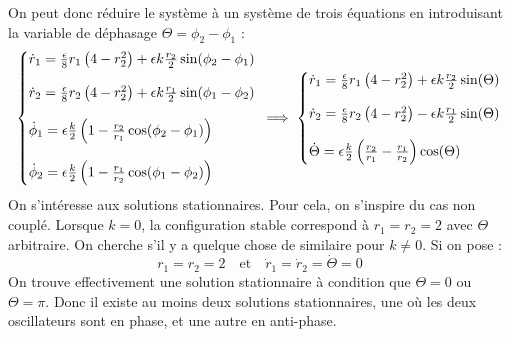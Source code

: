 On peut donc réduire le système à un système de trois équations en introduisant la variable de déphasage $\Theta = \phi_2 - \phi_1$ :
%
\begin{equation}
    \left\{\begin{array}{@{}l@{}}
        \dot{r}_1 =  \frac{\epsilon}{8} r_1 \left( 4 - r_2^2 \right) + \epsilon k\frac{r_2}{2}\sin(\phi_2 - \phi_1)\\
        \\
        \dot{r}_2 =  \frac{\epsilon}{8} r_2 \left( 4 - r_2^2 \right) + \epsilon k\frac{r_1}{2}\sin(\phi_1 - \phi_2)\\
        \\
        \dot{\phi}_1 = \epsilon \frac{k}{2}\left( 1 - \frac{r_2}{r_1}\cos(\phi_2 - \phi_1)\right) \\
        \\
        \dot{\phi}_2 = \epsilon \frac{k}{2}\left( 1 - \frac{r_1}{r_2}\cos(\phi_1 - \phi_2)\right)
    \end{array}\right.\,
    \implies
    \left\{\begin{array}{@{}l@{}}
        \dot{r}_1 = \frac{\epsilon}{8} r_1 \left( 4 - r_2^2 \right) + \epsilon k\frac{r_2}{2}\sin(\Theta)\\
        \\
        \dot{r}_2 = \frac{\epsilon}{8} r_2 \left( 4 - r_2^2 \right) - \epsilon k\frac{r_1}{2}\sin(\Theta) \\
        \\
      \dot{\Theta} = \epsilon \frac{k}{2}\left(  \frac{r_2}{r_1} - \frac{r_1}{r_2} \right)\cos(\Theta)
    \end{array}\right.\,
  \end{equation}
  On s'intéresse aux solutions stationnaires. Pour cela, on s'inspire du cas non couplé. Lorsque $k=0$, la configuration stable correspond à $r_1 = r_2 = 2 $
avec $\Theta$ arbitraire.
%
On cherche s'il y a quelque chose de similaire pour $k \neq 0$. Si on pose :
\[r_1 = r_2 = 2 \quad \text{et} \quad \dot{r}_1 = \dot{r}_2 = \dot{\Theta} = 0\]
On trouve effectivement une solution stationnaire à condition que $\Theta = 0$ ou $\Theta = \pi$. Donc il existe au moins deux solutions stationnaires, une où les deux oscillateurs sont en phase, et une autre en anti-phase.
%
